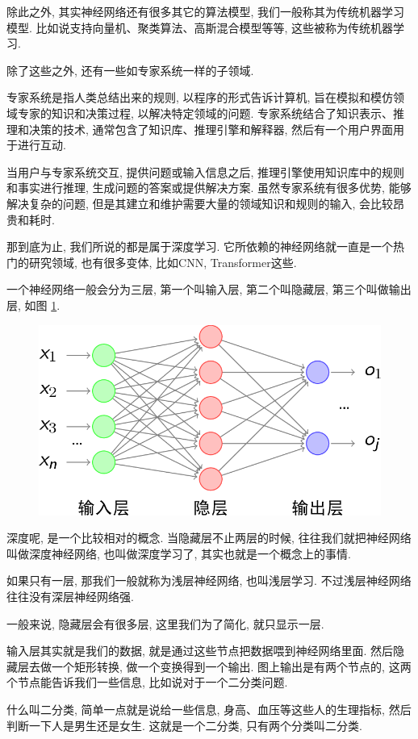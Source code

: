 除此之外, 其实神经网络还有很多其它的算法模型, 我们一般称其为传统机器学习模型. 比如说支持向量机、聚类算法、高斯混合模型等等, 这些被称为传统机器学习. 

除了这些之外, 还有一些如专家系统一样的子领域. 

专家系统是指人类总结出来的规则, 以程序的形式告诉计算机, 旨在模拟和模仿领域专家的知识和决策过程, 以解决特定领域的问题. 专家系统结合了知识表示、推理和决策的技术, 通常包含了知识库、推理引擎和解释器, 然后有一个用户界面用于进行互动. 

当用户与专家系统交互, 提供问题或输入信息之后, 推理引擎使用知识库中的规则和事实进行推理, 生成问题的答案或提供解决方案. 虽然专家系统有很多优势, 能够解决复杂的问题, 但是其建立和维护需要大量的领域知识和规则的输入, 会比较昂贵和耗时. 

那到底为止, 我们所说的都是属于深度学习. 它所依赖的神经网络就一直是一个热门的研究领域, 也有很多变体, 比如CNN, Transformer这些. 

一个神经网络一般会分为三层, 第一个叫输入层, 第二个叫隐藏层, 第三个叫做输出层, 如图 \ref{fig:img17_1}. 

\begin{figure}[ht]
  \centering
  \includegraphics[width=0.5\linewidth]{asset/20230909101753.png}
  \caption{}
  \label{fig:img17_1}
\end{figure}

深度呢, 是一个比较相对的概念. 当隐藏层不止两层的时候, 往往我们就把神经网络叫做深度神经网络, 也叫做深度学习了, 其实也就是一个概念上的事情. 

如果只有一层, 那我们一般就称为浅层神经网络, 也叫浅层学习. 不过浅层神经网络往往没有深层神经网络强. 

一般来说, 隐藏层会有很多层, 这里我们为了简化, 就只显示一层. 

输入层其实就是我们的数据, 就是通过这些节点把数据喂到神经网络里面. 然后隐藏层去做一个矩形转换, 做一个变换得到一个输出. 图上输出是有两个节点的, 这两个节点能告诉我们一些信息, 比如说对于一个二分类问题. 

什么叫二分类, 简单一点就是说给一些信息, 身高、血压等这些人的生理指标, 然后判断一下人是男生还是女生. 这就是一个二分类, 只有两个分类叫二分类. 

